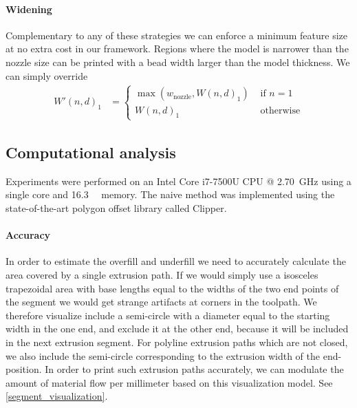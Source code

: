 \paragraph{Widening}
Complementary to any of these strategies we can enforce a minimum feature size at no extra cost in our framework.
Regions where the model is narrower than the nozzle size can be printed with a bead width larger than the model thickness.
We can simply override
\begin{align*}
W'(n,d)_1 &=
\begin{cases}
\max \left( w_\text{nozzle}  ,  W(n,d)_1 \right) & \text{ if } n = 1 \\
W(n,d)_1 & \text{ otherwise}
\end{cases}
\end{align*}





\subsection{Computational analysis}
Experiments were performed on an Intel Core i7-7500U CPU @ \SI{2.70}{\giga\hertz} using a single core and \SI{16.3}{\giga\byte} memory.
The naive method was implemented using the state-of-the-art polygon offset library called Clipper. \cite{johnson2014clipper}

\paragraph{Accuracy}
In order to estimate the overfill and underfill we need to accurately calculate the area covered by a single extrusion path.
If we would simply use a isosceles trapezoidal area with base lengths equal to the widths of the two end points of the segment we would get strange artifacts at corners in the toolpath.
We therefore visualize include a semi-circle with a diameter equal to the starting width in the one end, and exclude it at the other end, because it will be included in the next extrusion segment.
For polyline extrusion paths which are not closed, we also include the semi-circle corresponding to the extrusion width of the end-position.
In order to print such extrusion paths accurately, we can modulate the amount of material flow per millimeter based on this visualization model.
See \cref{segment_visualization}.

